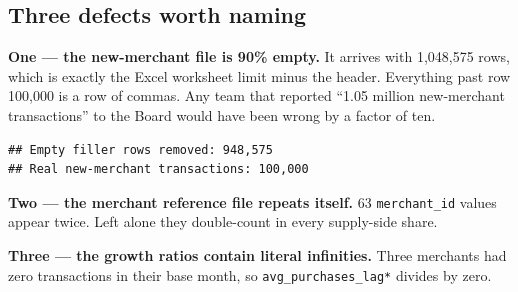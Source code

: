 \documentclass[
]{article}
\newenvironment{Shaded}{\begin{snugshade}}{\end{snugshade}}
\newcommand{\AttributeTok}[1]{\textcolor[rgb]{0.13,0.29,0.53}{#1}}
\newcommand{\FunctionTok}[1]{\textcolor[rgb]{0.13,0.29,0.53}{\textbf{#1}}}
\newcommand{\NormalTok}[1]{#1}
\newcommand{\OtherTok}[1]{\textcolor[rgb]{0.56,0.35,0.01}{#1}}
\newcommand{\SpecialCharTok}[1]{\textcolor[rgb]{0.81,0.36,0.00}{\textbf{#1}}}
\newcommand{\StringTok}[1]{\textcolor[rgb]{0.31,0.60,0.02}{#1}}
\begin{document}
\subsection{Three defects worth
naming}\label{three-defects-worth-naming}

\textbf{One --- the new-merchant file is 90\% empty.} It arrives with
1,048,575 rows, which is exactly the Excel worksheet limit minus the
header. Everything past row 100,000 is a row of commas. Any team that
reported ``1.05 million new-merchant transactions'' to the Board would
have been wrong by a factor of ten.

\begin{Shaded}
\end{Shaded}

\begin{verbatim}
## Empty filler rows removed: 948,575 
## Real new-merchant transactions: 100,000
\end{verbatim}

\textbf{Two --- the merchant reference file repeats itself.} 63
\texttt{merchant\_id} values appear twice. Left alone they double-count
in every supply-side share.

\textbf{Three --- the growth ratios contain literal infinities.} Three
merchants had zero transactions in their base month, so
\texttt{avg\_purchases\_lag*} divides by zero.
\end{document}
